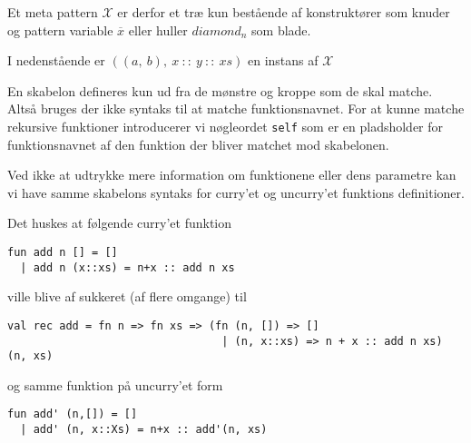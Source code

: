 \documentclass[oneside]{memoir}
\theoremstyle{definition}
\begin{document}
Et meta pattern $\mathcal{X}$ er derfor et træ kun bestående af konstruktører som
knuder og pattern variable $\overline{x}$ eller huller $diamond_n$ som
blade. 

I nedenstående er $((a,\ b),\ x\ ::\ y\ ::\ xs)$ en instans af $\mathcal{X}$



En skabelon defineres kun ud fra de mønstre og kroppe som de skal matche. Altså
bruges der ikke syntaks til at matche funktionsnavnet. For at kunne matche
rekursive funktioner introducerer vi nøgleordet \texttt{self} som er en
pladsholder for funktionsnavnet af den funktion der bliver matchet mod
skabelonen.

Ved ikke at udtrykke mere information om funktionene eller dens parametre kan vi
have samme skabelons syntaks for curry'et og uncurry'et funktions definitioner.

Det huskes at følgende curry'et funktion 

\begin{verbatim}
fun add n [] = []
  | add n (x::xs) = n+x :: add n xs
\end{verbatim}

ville blive af sukkeret (af flere omgange) til

\begin{verbatim}
val rec add = fn n => fn xs => (fn (n, []) => []
                                 | (n, x::xs) => n + x :: add n xs) (n, xs)
\end{verbatim}

og samme funktion på uncurry'et form

\begin{verbatim}
fun add' (n,[]) = []
  | add' (n, x::Xs) = n+x :: add'(n, xs)
\end{verbatim}
\end{document}
